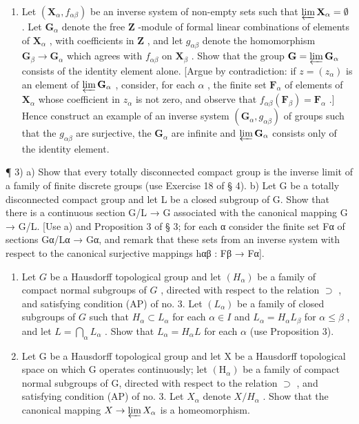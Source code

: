 \begin{enumerate}
\def\labelenumi{\arabic{enumi})}
\setcounter{enumi}{1}
\tightlist
\item
  Let \((\mathbf{X}_{\alpha}, f_{\alpha \beta})\) be an inverse system of non-empty sets such that \(\varprojlim \mathbf{X}_{\alpha} = \emptyset\) . Let \(\mathbf{G}_{\alpha}\) denote the free \(\mathbf{Z}\) -module of formal linear combinations of elements of \(\mathbf{X}_{\alpha}\) , with coefficients in \(\mathbf{Z}\) , and let \(g_{\alpha \beta}\) denote the homomorphism \(\mathbf{G}_{\beta} \to \mathbf{G}_{\alpha}\) which agrees with \(f_{\alpha \beta}\) on \(\mathbf{X}_{\beta}\) . Show that the group \(\mathbf{G} = \varprojlim \mathbf{G}_{\alpha}\) consists of the identity element alone. {[}Argue by contradiction: if \(z = (z_{\alpha})\) is an element of \(\varprojlim \mathbf{G}_{\alpha}\) , consider, for each \(\alpha\) , the finite set \(\mathbf{F}_{\alpha}\) of elements of \(\mathbf{X}_{\alpha}\) whose coefficient in \(z_{\alpha}\) is not zero, and observe that \(f_{\alpha \beta}(\mathbf{F}_{\beta}) = \mathbf{F}_{\alpha}\) .{]} Hence construct an example of an inverse system \((\mathbf{G}_{\alpha}, g_{\alpha \beta})\) of groups such that the \(g_{\alpha \beta}\) are surjective, the \(\mathbf{G}_{\alpha}\) are infinite and \(\varprojlim \mathbf{G}_{\alpha}\) consists only of the identity element.
\end{enumerate}

¶ 3) a) Show that every totally disconnected compact group is the inverse limit of a family of finite discrete groups (use Exercise 18 of § 4). b) Let G be a totally disconnected compact group and let L be a closed subgroup of G. Show that there is a continuous section G/L → G associated with the canonical mapping G → G/L. {[}Use a) and Proposition 3 of § 3; for each α consider the finite set Fα of sections Gα/Lα → Gα, and remark that these sets from an inverse system with respect to the canonical surjective mappings hαβ : Fβ → Fα{]}.

\begin{enumerate}
\def\labelenumi{\arabic{enumi})}
\setcounter{enumi}{3}
\item
  Let \(G\) be a Hausdorff topological group and let \((H_{\alpha})\) be a family of compact normal subgroups of \(G\) , directed with respect to the relation \(\supset\) , and satisfying condition (AP) of no. 3. Let \((L_{\alpha})\) be a family of closed subgroups of \(G\) such that \(H_{\alpha} \subset L_{\alpha}\) for each \(\alpha \in I\) and \(L_{\alpha} = H_{\alpha}L_{\beta}\) for \(\alpha \leqslant \beta\) , and let \(L = \bigcap_{\alpha} L_{\alpha}\) . Show that \(L_{\alpha} = H_{\alpha}L\) for each \(\alpha\) (use Proposition 3).
\item
  Let G be a Hausdorff topological group and let X be a Hausdorff topological space on which G operates continuously; let \((\mathrm{H}_{\alpha})\) be a family of compact normal subgroups of G, directed with respect to the relation \(\supset\) , and satisfying condition (AP) of no. 3. Let \(X_{\alpha}\) denote \(X/H_{\alpha}\) . Show that the canonical mapping \(X \to \varprojlim X_{\alpha}\) is a homeomorphism.
\end{enumerate}

